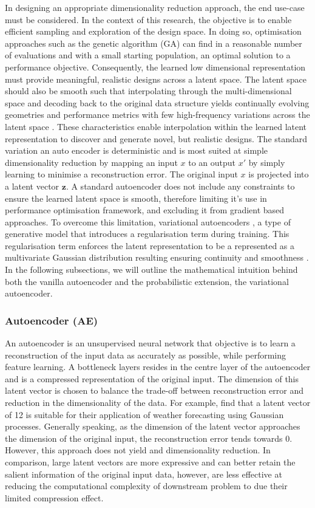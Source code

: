 \documentclass{article}
\begin{document}
In designing an appropriate dimensionality reduction approach, the end use-case must be considered. In the context of this research, the objective is to enable efficient sampling and exploration of the design space. In doing so, optimisation approaches such as the genetic algorithm (GA) can find in a reasonable number of evaluations and with a small starting population, an optimal solution to a performance objective. Consequently, the learned low dimensional representation must provide meaningful, realistic designs across a latent space. The latent space should also be smooth such that interpolating through the multi-dimensional space and decoding back to the original data structure yields continually evolving geometries and performance metrics with few high-frequency variations across the latent space \citep{Danhaive2022}. These characteristics enable interpolation within the learned latent representation to discover and generate novel, but realistic designs. The standard variation an auto encoder is deterministic and is most suited at simple dimensionality reduction by mapping an input $x$ to an output $x'$ by simply learning to minimise a reconstruction error. The original input $x$ is projected into a latent vector $\textbf{z}$. A standard autoencoder does not include any constraints to ensure the learned latent space is smooth, therefore limiting it's use in performance optimisation framework, and excluding it from gradient based approaches. To overcome this limitation, variational autoencoders \citep{Kingma2013}, a type of generative model \citep{Danhaive2022} that introduces a regularisation term during training. This regularisation term enforces the latent representation to be a represented as a multivariate Gaussian distribution resulting ensuring continuity and smoothness \citep{Huang2022}. In the following subsections, we will outline the mathematical intuition behind both the vanilla autoencoder and the probabilistic extension, the variational autoencoder.

\subsubsection{Autoencoder (AE)}
An autoencoder is an unsupervised neural network that objective is to learn a reconstruction of the input data as accurately as possible, while performing feature learning. A bottleneck layers resides in the centre layer of the autoencoder and is a compressed representation of the original input. The dimension of this latent vector is chosen to balance the trade-off between reconstruction error and reduction in the dimensionality of the data. For example, \cite{Donnelly2024} find that a latent vector of 12 is suitable for their application of weather forecasting using Gaussian processes. Generally speaking, as the dimension of the latent vector approaches the dimension of the original input, the reconstruction error tends towards 0. However, this approach does not yield and dimensionality reduction. In comparison, large latent vectors are more expressive and can better retain the salient information of the original input data, however, are less effective at reducing the computational complexity of downstream problem to due their limited compression effect.
\end{document}

